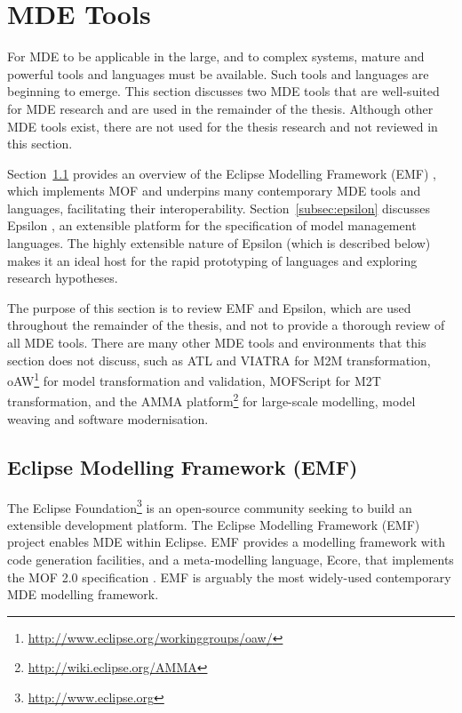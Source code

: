
\section{MDE Tools}
\label{sec:mde_tools}
For MDE to be applicable in the large, and to complex systems, mature and powerful tools and languages must be available. Such tools and languages are beginning to emerge. This section discusses two MDE tools that are well-suited for MDE research and are used in the remainder of the thesis. Although other MDE tools exist, there are not used for the thesis research and not reviewed in this section.

Section~\ref{subsec:emf} provides an overview of the Eclipse Modelling Framework (EMF) \cite{steinberg09emf}, which implements MOF and underpins many contemporary MDE tools and languages, facilitating their interoperability. Section~\ref{subsec:epsilon} discusses Epsilon \cite{kolovos09thesis}, an extensible platform for the specification of model management languages. The highly extensible nature of Epsilon (which is described below) makes it an ideal host for the rapid prototyping of languages and exploring research hypotheses.  

The purpose of this section is to review EMF and Epsilon, which are used throughout the remainder of the thesis, and not to provide a thorough review of all MDE tools. There are many other MDE tools and environments that this section does not discuss, such as ATL \cite{jouault05transforming} and VIATRA \cite{VIATRA} for M2M transformation, oAW\footnote{\url{http://www.eclipse.org/workinggroups/oaw/}} for model transformation and validation, MOFScript \cite{oldevik05toward} for M2T transformation, and the AMMA platform\footnote{\url{http://wiki.eclipse.org/AMMA}} for large-scale modelling, model weaving and software modernisation.

\subsection{Eclipse Modelling Framework (EMF)}
\label{subsec:emf}
The Eclipse Foundation\footnote{\url{http://www.eclipse.org}} is an open-source community seeking to build an extensible development platform. The Eclipse Modelling Framework (EMF) project \cite{steinberg09emf} enables MDE within Eclipse. EMF provides a modelling framework with code generation facilities, and a meta-modelling language, Ecore, that implements the MOF 2.0 specification \cite{mof}. EMF is arguably the most widely-used contemporary MDE modelling framework.

